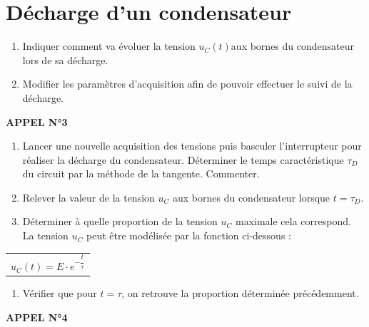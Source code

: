 \documentclass[a4paper,12pt,fleqn]{scrartcl}%
\begin{document}
\section{Décharge d'un condensateur}
	\begin{enumerate}[resume]
		\item Indiquer comment va évoluer la tension $u_C(t)$aux bornes du condensateur lors de sa décharge.
		\item Modifier les paramètres d'acquisition afin de pouvoir effectuer le suivi de la décharge.
	\end{enumerate}
\begin{center}
	\textbf{APPEL N°3}
\end{center}
	\begin{enumerate}[resume]
		\item Lancer une nouvelle acquisition des tensions puis basculer l'interrupteur pour réaliser la décharge du condensateur.
		Déterminer le temps caractéristique $\tau_D$ du circuit par la méthode de la tangente. Commenter.
		\item Relever la valeur de la tension $u_C$ aux bornes du condensateur lorsque $t=\tau_D$.
		\item Déterminer à quelle proportion de la tension $u_C$ maximale cela correspond.\\
		La tension $u_C$ peut être modélisée par la fonction ci-dessous :
	\end{enumerate}
		\begin{tabular}{>{\centering\arraybackslash}m{\linewidth}}
			$u_C(t) = E \cdot e^{-\dfrac{t}{\tau}} $
		\end{tabular}
	\begin{enumerate}[resume]
		\item Vérifier que pour $t=\tau$, on retrouve la proportion déterminée précédemment.
	\end{enumerate}
\begin{center}
	\textbf{APPEL N°4}
\end{center}
\end{document}
